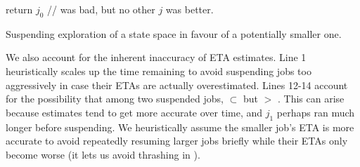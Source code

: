 \begin{algorithm}[t]
	return $j_0$ //  was bad, but no other $j$ was better.
	\caption{Suspending exploration of a state space in favour of a potentially smaller one.}
	\label{alg:shouldworkblock}
\end{algorithm}

%
We also account for the inherent inaccuracy of ETA estimates.
Line 1 heuristically scales up the time remaining to avoid suspending jobs too aggressively
in case their ETAs are actually overestimated.
Lines 12-14 account for the
possibility that among two suspended jobs,
 $\subset$ 
but
 $>$ .
This can arise because estimates tend to get more accurate over time,
and $j_1$ perhaps ran much longer before suspending.
We heuristically assume the smaller job's ETA is more accurate
to avoid repeatedly resuming larger jobs briefly while their ETAs only become worse
(it lets us avoid thrashing in \quicksand).



